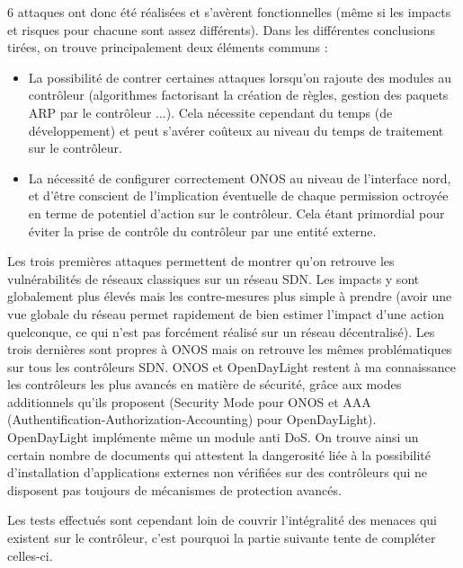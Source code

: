 6 attaques ont donc été réalisées et s'avèrent fonctionnelles (même si les impacts et risques pour chacune sont assez différents). Dans les différentes conclusions tirées, on trouve principalement deux éléments communs :

\begin{itemize}

\item La possibilité de contrer certaines attaques lorsqu'on rajoute des modules au contrôleur (algorithmes factorisant la création de règles, gestion des paquets ARP par le contrôleur ...). Cela nécessite cependant du temps (de développement) et peut s'avérer coûteux au niveau du temps de traitement sur le contrôleur.

\item La nécessité de configurer correctement ONOS au niveau de l'interface nord, et d'être conscient de l'implication éventuelle de chaque permission octroyée en terme de potentiel d'action sur le contrôleur. Cela étant primordial pour éviter la prise de contrôle du contrôleur par une entité externe.

\end{itemize}

Les trois premières attaques permettent de montrer qu'on retrouve les vulnérabilités de réseaux classiques sur un réseau SDN. Les impacts y sont globalement plus élevés mais les contre-mesures plus simple à prendre (avoir une vue globale du réseau permet rapidement de bien estimer l'impact d'une action quelconque, ce qui n'est pas forcément réalisé sur un réseau décentralisé).
Les trois dernières sont propres à ONOS mais on retrouve les mêmes problématiques sur tous les contrôleurs SDN. ONOS et OpenDayLight restent à ma connaissance les contrôleurs les plus avancés en matière de sécurité, grâce aux modes additionnels qu'ils proposent (Security Mode pour ONOS et AAA (Authentification-Authorization-Accounting) pour OpenDayLight). OpenDayLight implémente même un module anti DoS. On trouve ainsi un certain nombre de documents qui attestent la dangerosité liée à la possibilité d'installation d'applications externes non vérifiées sur des contrôleurs qui ne disposent pas toujours de mécanismes de protection avancés.

Les tests effectués sont cependant loin de couvrir l'intégralité des menaces qui existent sur le contrôleur, c'est pourquoi la partie suivante tente de compléter celles-ci.
